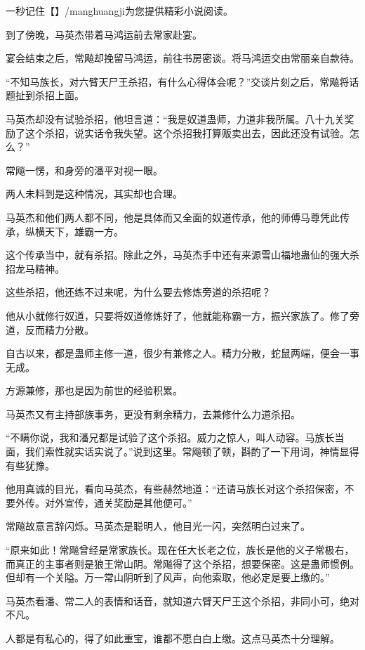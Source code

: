 
\begin{this_body}

一秒记住【】/manghuangji为您提供精彩小说阅读。

到了傍晚，马英杰带着马鸿运前去常家赴宴。

宴会结束之后，常飚却挽留马鸿运，前往书房密谈。将马鸿运交由常丽亲自款待。

“不知马族长，对六臂天尸王杀招，有什么心得体会呢？”交谈片刻之后，常飚将话题扯到杀招上面。

马英杰却没有试验杀招，他坦言道：“我是奴道蛊师，力道非我所属。八十九关奖励了这个杀招，说实话令我失望。这个杀招我打算贩卖出去，因此还没有试验。怎么？”

常飚一愣，和身旁的潘平对视一眼。

两人未料到是这种情况，其实却也合理。

马英杰和他们两人都不同，他是具体而又全面的奴道传承，他的师傅马尊凭此传承，纵横天下，雄霸一方。

这个传承当中，就有杀招。除此之外，马英杰手中还有来源雪山福地蛊仙的强大杀招龙马精神。

这些杀招，他还练不过来呢，为什么要去修炼旁道的杀招呢？

他从小就修行奴道，只要将奴道修炼好了，他就能称霸一方，振兴家族了。修了旁道，反而精力分散。

自古以来，都是蛊师主修一道，很少有兼修之人。精力分散，蛇鼠两端，便会一事无成。

方源兼修，那也是因为前世的经验积累。

马英杰又有主持部族事务，更没有剩余精力，去兼修什么力道杀招。

“不瞒你说，我和潘兄都是试验了这个杀招。威力之惊人，叫人动容。马族长当面，我们索性就实话实说了。”说到这里。常飚顿了顿，斟酌了一下用词，神情显得有些犹豫。

他用真诚的目光，看向马英杰，有些赫然地道：“还请马族长对这个杀招保密，不要外传。对外宣传，通关奖励是其他便可。”

常飚故意言辞闪烁。马英杰是聪明人，他目光一闪，突然明白过来了。

“原来如此！常飚曾经是常家族长。现在任大长老之位，族长是他的义子常极右，而真正的主事者则是狼王常山阴。常飚得了这个杀招，想要保密。这是蛊师惯例。但却有一个关隘。万一常山阴听到了风声，向他索取，他必定是要上缴的。”

马英杰看潘、常二人的表情和话音，就知道六臂天尸王这个杀招，非同小可，绝对不凡。

人都是有私心的，得了如此重宝，谁都不愿白白上缴。这点马英杰十分理解。


\end{this_body}
